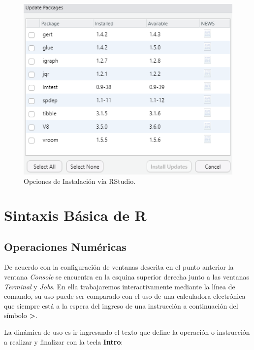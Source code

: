 \documentclass[
]{book}
\begin{document}
\begin{figure}

{\centering \includegraphics[width=6.39in]{img/pack6} 

}

\caption{Opciones de Instalación vía RStudio.}\label{fig:img-pack-5}
\end{figure}

\hypertarget{sin-bas}{%
\chapter{Sintaxis Básica de R}\label{sin-bas}}

\hypertarget{op-num}{%
\section{Operaciones Numéricas}\label{op-num}}

De acuerdo con la configuración de ventanas descrita en el punto anterior la ventana \emph{Console} se encuentra en la esquina superior derecha junto a las ventanas \emph{Terminal} y \emph{Jobs}. En ella trabajaremos interactivamente mediante la línea de comando, su uso puede ser comparado con el uso de una calculadora electrónica que siempre está a la espera del ingreso de una instrucción a continuación del símbolo \textbf{\textgreater{}}.

La dinámica de uso es ir ingresando el texto que define la operación o instrucción a realizar y finalizar con la tecla \textbf{Intro}:
\end{document}
